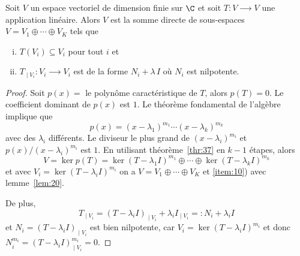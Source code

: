 \begin{lemma}
  \label{lem:19}
  Soit $V$ un espace vectoriel de dimension finie sur $\C$ et soit $T\colon V ⟶ V$ une application linéaire. Alors $V$ est la somme directe de sous-espaces   $V = V_1 ⊕ \cdots ⊕ V_K$  tels que 
  \begin{enumerate}[i)]
  \item $T(V_i) ⊆ V_i$ pour tout $i$ et \label{item:10}
  \item $T_{∣V_i} \colon V_i ⟶ V_i$
    est de la forme $N_i + λ \, I$ où $N_i$ est nilpotente. \label{item:11}
  \end{enumerate}
\end{lemma}

\begin{proof}
Soit $p(x) =$ le polyn{\^o}me caractéristique  de $T$, alors $p(T) = 0$.
Le coefficient dominant de $p(x)$ est $1$.   Le théorème fondamental de l'algèbre implique que 
\begin{displaymath}
  p(x) = ( x - λ_1)^{m_1} \cdots ( x - λ_k)^{m_k} 
\end{displaymath}
avec des $λ_i$ différents. 
Le diviseur le plus grand de $( x - λ_i)^{m_i}$ et $p(x) / ( x - λ_i)^{m_i}$ est $1$. En utilisant théorème~\ref{thr:37} en $k-1$ étapes, alors 
\begin{displaymath} 
V =   \ker p(T) = \ker (T - λ_1I)^{m_1} ⊕  \cdots ⊕ \ker( T - λ_kI)^{m_k}
\end{displaymath}
et avec $V_i = \ker( T - λ_iI)^{m_i}$ on a $V = V_1 ⊕ \cdots ⊕ V_K$  et \ref{item:10}) avec lemme~\ref{lem:20}. \newline

De plus, $$T_{∣V_i} = (T - λ_iI)_{∣V_i} + λ_iI_{∣V_i} =\colon N_i + λ_iI$$ et $N_i = (T - λ_iI)_{∣V_i}$ est bien nilpotente, car $V_i = \ker( T - λ_iI)^{m_i}$ et donc $N_i^{m_i} = (T - λ_iI)^{m_i}_{∣V_i} = 0$.
\end{proof}


